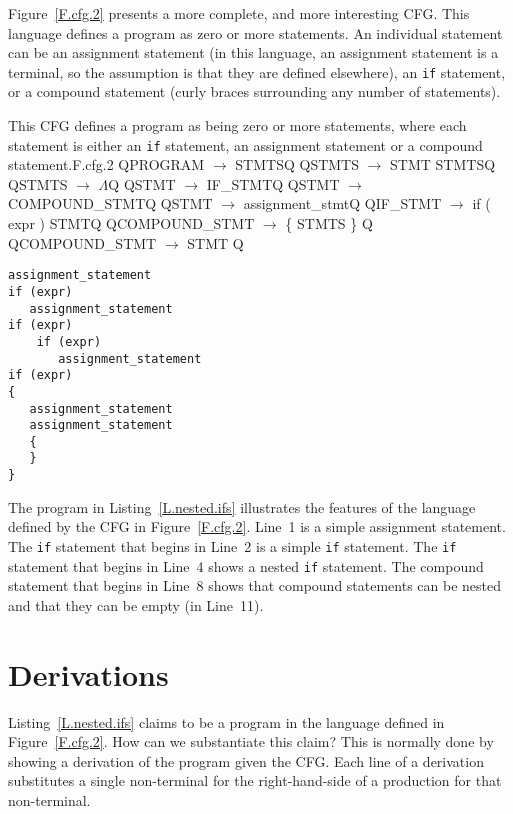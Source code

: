 \documentclass[letterpaper,12pt,openany,reqno]{book}%
\newcommand{\code}[1] {\lstinline[breaklines=yes,breakatwhitespace=yes]{#1}}
\newcommand{\cfgprod}[2] {{\ttfamily #1} $\rightarrow$ {\ttfamily #2}}
\begin{document}
Figure~\ref{F.cfg.2} presents a more complete, and more interesting CFG. This language defines a program as zero or more statements. An individual statement can be an assignment statement (in this language, an assignment statement is a terminal, so the assumption is that they are defined elsewhere), an \code{if} statement, or a compound statement (curly braces surrounding any number of statements). 

\begin{cfg}{This CFG defines a program as being zero or more statements, where each statement is either an \code{if} statement, an assignment statement or a compound statement.}{F.cfg.2}
Q\cfgprod{PROGRAM}{STMTS}Q
Q\cfgprod{STMTS}{STMT STMTS}Q
Q\cfgprod{STMTS}{$\Lambda$}Q
Q\cfgprod{STMT}{IF\_STMT}Q
Q\cfgprod{STMT}{COMPOUND\_STMT}Q
Q\cfgprod{STMT}{assignment\_stmt}Q
Q\cfgprod{IF\_STMT} {if ( expr ) STMT}Q
Q\cfgprod{COMPOUND\_STMT} { \{ STMTS \} }Q
Q\cfgprod{COMPOUND\_STMT} { STMT }Q
\end{cfg}

\begin{lstlisting}[caption={Sample program in the language defined by the CFG in Figure~\ref{F.cfg.2}},label=L.nested.ifs]
assignment_statement
if (expr)
   assignment_statement
if (expr)
    if (expr)
       assignment_statement
if (expr)
{
   assignment_statement
   assignment_statement
   {
   }
}
\end{lstlisting}

The program in Listing~\ref{L.nested.ifs} illustrates the features of the language defined by the CFG in Figure~\ref{F.cfg.2}. Line~1 is a simple assignment statement. The \code{if} statement that begins in Line~2 is a simple \code{if} statement. The \code{if} statement that begins in Line~4 shows a nested \code{if} statement. The compound statement that begins in Line~8 shows that compound statements can be nested and that they can be empty (in Line~11).

\section{Derivations}

Listing~\ref{L.nested.ifs} claims to be a program in the language defined in Figure~\ref{F.cfg.2}. How can we substantiate this claim? This is normally done by showing a derivation of the program given the CFG. Each line of a derivation substitutes a single non-terminal for the right-hand-side of a production for that non-terminal. 
\end{document}
